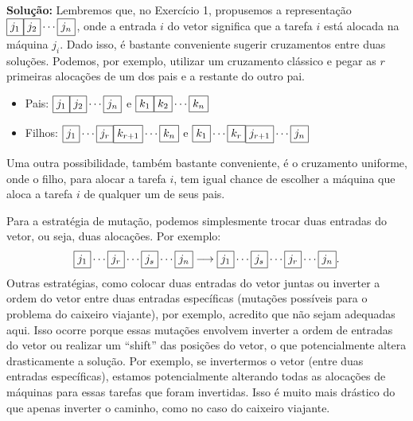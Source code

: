 \noindent \textbf{Solução:} Lembremos que, no Exercício 1, propusemos a representação $\text{\fbox{$j_1$}} \text{\fbox{$j_2$}} \cdots \text{\fbox{$j_n$}}$, onde a entrada $i$ do vetor significa que a tarefa $i$ está alocada na máquina $j_i$. Dado isso, é bastante conveniente sugerir cruzamentos entre duas soluções. Podemos, por exemplo, utilizar um cruzamento clássico e pegar as $r$ primeiras alocações de um dos pais e a restante do outro pai.

\begin{itemize}
    \item Pais: $\text{\fbox{$j_1$}} \text{\fbox{$j_2$}} \cdots \text{\fbox{$j_n$}}$ e $\text{\fbox{$k_1$}} \text{\fbox{$k_2$}} \cdots \text{\fbox{$k_n$}}$
    \item Filhos: $\text{\fbox{$j_1$}} \cdots \text{\fbox{$j_r$}} \text{\fbox{$k_{r+1}$}} \cdots \text{\fbox{$k_n$}}$ e $\text{\fbox{$k_1$}} \cdots \text{\fbox{$k_r$}} \text{\fbox{$j_{r+1}$}} \cdots \text{\fbox{$j_n$}}$
\end{itemize}
Uma outra possibilidade, também bastante conveniente, é o cruzamento uniforme, onde o filho, para alocar a tarefa $i$, tem igual chance de escolher a máquina que aloca a tarefa $i$ de qualquer um de seus pais.

Para a estratégia de mutação, podemos simplesmente trocar duas entradas do vetor, ou seja, duas alocações. Por exemplo:
\[\text{\fbox{$j_1$}} \cdots \text{\fbox{$j_r$}} \cdots \text{\fbox{$j_s$}} \cdots \text{\fbox{$j_n$}} \longrightarrow \text{\fbox{$j_1$}} \cdots \text{\fbox{$j_s$}} \cdots \text{\fbox{$j_r$}} \cdots \text{\fbox{$j_n$}}.\]
Outras estratégias, como colocar duas entradas do vetor juntas ou inverter a ordem do vetor entre duas entradas específicas (mutações possíveis para o problema do caixeiro viajante), por exemplo, acredito que não sejam adequadas aqui. Isso ocorre porque essas mutações envolvem inverter a ordem de entradas do vetor ou realizar um ``shift'' das posições do vetor, o que potencialmente altera drasticamente a solução. Por exemplo, se invertermos o vetor (entre duas entradas específicas), estamos potencialmente alterando todas as alocações de máquinas para essas tarefas que foram invertidas. Isso é muito mais drástico do que apenas inverter o caminho, como no caso do caixeiro viajante.
